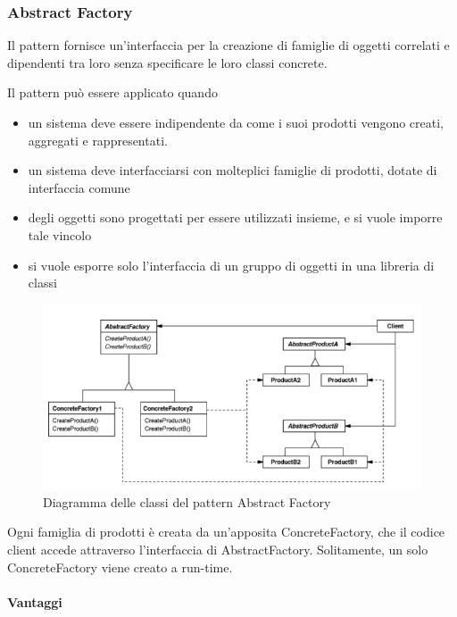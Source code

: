 \subsubsection{ Abstract Factory }

Il pattern  fornisce un'interfaccia per la creazione
di famiglie di oggetti correlati e dipendenti tra loro senza specificare le loro
classi concrete.

Il pattern può essere applicato quando

\begin{itemize}
  \item un sistema deve essere indipendente da come i suoi prodotti vengono
  creati, aggregati e rappresentati.
  \item un sistema deve interfacciarsi con molteplici famiglie di prodotti, dotate di
  interfaccia comune
  \item degli oggetti sono progettati per essere utilizzati insieme, e si vuole
  imporre tale vincolo
  \item si vuole esporre solo l'interfaccia di un gruppo di oggetti in una libreria di
  classi
\end{itemize}

\begin{figure}[h!]
  \centering
  \includegraphics[scale=0.55]{imgs/abstract_factory.jpg}
  \caption{Diagramma delle classi del pattern Abstract Factory}
\end{figure}

Ogni famiglia di prodotti è creata da un'apposita ConcreteFactory, che il codice
client accede attraverso l'interfaccia di AbstractFactory. Solitamente, un solo
ConcreteFactory viene creato a run-time.

\paragraph{ Vantaggi }

